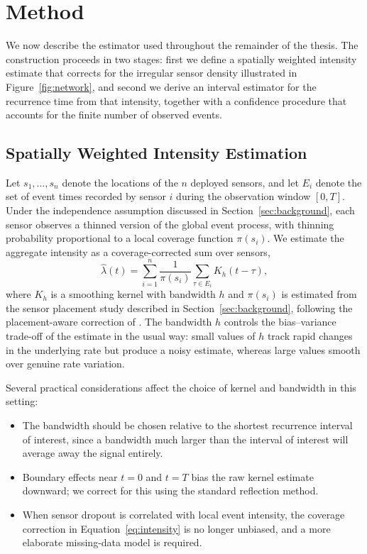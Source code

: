 \section{Method}
\label{sec:method}

We now describe the estimator used throughout the remainder of the thesis.
The construction proceeds in two stages: first we define a spatially
weighted intensity estimate that corrects for the irregular sensor density
illustrated in Figure~\ref{fig:network}, and second we derive an interval
estimator for the recurrence time from that intensity, together with a
confidence procedure that accounts for the finite number of observed
events.

\subsection{Spatially Weighted Intensity Estimation}
Let $s_1, \dots, s_n$ denote the locations of the $n$ deployed sensors, and
let $E_i$ denote the set of event times recorded by sensor $i$ during the
observation window $[0, T]$. Under the independence assumption discussed in
Section~\ref{sec:background}, each sensor observes a thinned version of the
global event process, with thinning probability proportional to a local
coverage function $\pi(s_i)$. We estimate the aggregate intensity as a
coverage-corrected sum over sensors,
\begin{equation}
\label{eq:intensity}
\hat{\lambda}(t) = \sum_{i=1}^{n} \frac{1}{\pi(s_i)} \sum_{\tau \in E_i}
K_h(t - \tau),
\end{equation}
where $K_h$ is a smoothing kernel with bandwidth $h$ and $\pi(s_i)$ is
estimated from the sensor placement study described in
Section~\ref{sec:background}, following the placement-aware correction of
\citet{fictional2020}. The bandwidth $h$ controls the bias--variance
trade-off of the estimate in the usual way: small values of $h$ track rapid
changes in the underlying rate but produce a noisy estimate, whereas large
values smooth over genuine rate variation.

Several practical considerations affect the choice of kernel and bandwidth
in this setting:
\begin{itemize}
  \item The bandwidth should be chosen relative to the shortest recurrence
  interval of interest, since a bandwidth much larger than the interval of
  interest will average away the signal entirely.
  \item Boundary effects near $t = 0$ and $t = T$ bias the raw kernel
  estimate downward; we correct for this using the standard reflection
  method.
  \item When sensor dropout is correlated with local event intensity, the
  coverage correction in Equation~\eqref{eq:intensity} is no longer
  unbiased, and a more elaborate missing-data model is required.
\end{itemize}

